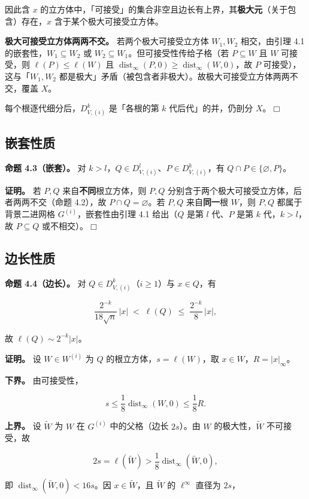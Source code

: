 \documentclass[a4paper,11pt,openany]{ctexbook}
\numberwithin{equation}{chapter}
\numberwithin{figure}{chapter}
\numberwithin{table}{chapter}
\begin{document}
因此含 $x$ 的立方体中，「可接受」的集合非空且边长有上界，其\textbf{极大元}（关于包含）存在，$x$ 含于某个极大可接受立方体。

\textbf{极大可接受立方体两两不交。} 若两个极大可接受立方体 $W_1,W_2$ 相交，由引理 4.1 的嵌套性，$W_1\subseteq W_2$ 或 $W_2\subseteq W_1$。但可接受性传给子格（若 $P\subseteq W$ 且 $W$ 可接受，则 $\ell(P)\le\ell(W)$ 且 $\operatorname{dist}_\infty(P,0)\ge\operatorname{dist}_\infty(W,0)$，故 $P$ 可接受），这与「$W_1,W_2$ 都是极大」矛盾（被包含者非极大）。故极大可接受立方体两两不交，覆盖 $X$。

每个根逐代细分后，$D_{V,(i)}^k$ 是「各根的第 $k$ 代后代」的并，仍剖分 $X$。$\Box$

\subsection{嵌套性质}

\textbf{命题 4.3（嵌套）。} 对 $k>l$，$Q\in D_{V,(i)}^l$、$P\in D_{V,(i)}^k$，有 $Q\cap P\in\{\varnothing,P\}$。

\textbf{证明。} 若 $P,Q$ 来自\textbf{不同}根立方体，则 $P,Q$ 分别含于两个极大可接受立方体，后者两两不交（命题 4.2），故 $P\cap Q=\varnothing$。若 $P,Q$ 来自\textbf{同一}根 $W$，则 $P,Q$ 都属于背景二进网格 $G^{(i)}$，嵌套性由引理 4.1 给出（$Q$ 是第 $l$ 代、$P$ 是第 $k$ 代，$k>l$，故 $P\subseteq Q$ 或不相交）。$\Box$

\subsection{边长性质}

\textbf{命题 4.4（边长）。} 对 $Q\in D_{V,(i)}^k$（$i\ge1$）与 $x\in Q$，有

$$\frac{2^{-k}}{18\sqrt n}\,|x| \;<\; \ell(Q)\;\le\; \frac{2^{-k}}{8}\,|x|,$$

故 $\ell(Q)\sim2^{-k}|x|$。

\textbf{证明。} 设 $W\in W^{(i)}$ 为 $Q$ 的根立方体，$s=\ell(W)$，取 $x\in W$，$R=|x|_\infty$。

\textbf{下界。} 由可接受性，

$$s\le\frac18\operatorname{dist}_\infty(W,0)\le\frac18 R.$$

\textbf{上界。} 设 $\widetilde W$ 为 $W$ 在 $G^{(i)}$ 中的父格（边长 $2s$）。由 $W$ 的极大性，$\widetilde W$ 不可接受，故

$$2s=\ell(\widetilde W)>\frac18\operatorname{dist}_\infty(\widetilde W,0),$$

即 $\operatorname{dist}_\infty(\widetilde W,0)<16s$。因 $x\in\widetilde W$，且 $\widetilde W$ 的 $\ell^\infty$ 直径为 $2s$，
\end{document}
